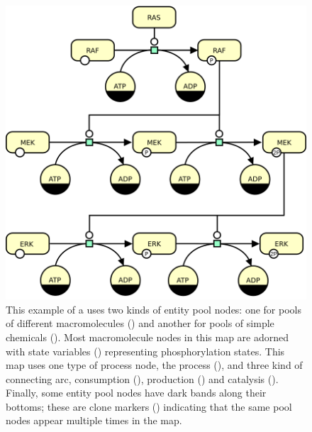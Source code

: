\begin{figure}[htb]
  \centering
  \vspace*{-0.75em}
  \includegraphics[scale=0.8]{images/MAPK-only}
  \caption{This example of a \PD uses two kinds of entity pool nodes: one for pools of different macromolecules () and another for pools of simple chemicals (). Most macromolecule nodes in this map are adorned with state variables () representing phosphorylation states. This map uses one type of process node, the process (), and three kind of connecting arc, consumption (), production () and catalysis ().  Finally, some entity pool nodes have dark bands along their bottoms; these are clone markers () indicating that the same pool nodes appear multiple times in the map.}
  \label{fig:eg1}
\end{figure}

